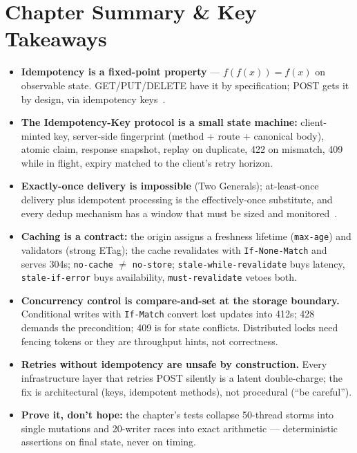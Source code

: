 \section{Chapter Summary \& Key Takeaways}
\label{sec:ch10-summary}

\begin{itemize}
  \item \textbf{Idempotency is a fixed-point property} ---
        $f(f(x)) = f(x)$ on observable state. GET/PUT/DELETE have it by
        specification; POST gets it by design, via idempotency
        keys~\cite{rfc9110}.
  \item \textbf{The Idempotency-Key protocol is a small state machine:}
        client-minted key, server-side fingerprint (method + route +
        canonical body), atomic claim, response snapshot, replay on
        duplicate, 422 on mismatch, 409 while in flight, expiry matched to
        the client's retry horizon.
  \item \textbf{Exactly-once delivery is impossible} (Two Generals);
        at-least-once delivery plus idempotent processing is the
        effectively-once substitute, and every dedup mechanism has a window
        that must be sized and monitored~\cite{kleppmann2017ddia}.
  \item \textbf{Caching is a contract:} the origin assigns a freshness
        lifetime (\texttt{max-age}) and validators (strong ETag); the cache
        revalidates with \texttt{If-None-Match} and serves 304s;
        \texttt{no-cache} $\neq$ \texttt{no-store};
        \texttt{stale-while-revalidate} buys latency,
        \texttt{stale-if-error} buys availability, \texttt{must-revalidate}
        vetoes both.
  \item \textbf{Concurrency control is compare-and-set at the storage
        boundary.} Conditional writes with \texttt{If-Match} convert lost
        updates into 412s; 428 demands the precondition; 409 is for state
        conflicts. Distributed locks need fencing tokens or they are
        throughput hints, not correctness.
  \item \textbf{Retries without idempotency are unsafe by construction.}
        Every infrastructure layer that retries POST silently is a latent
        double-charge; the fix is architectural (keys, idempotent methods),
        not procedural (``be careful'').
  \item \textbf{Prove it, don't hope:} the chapter's tests collapse
        50-thread storms into single mutations and 20-writer races into
        exact arithmetic --- deterministic assertions on final state, never
        on timing.
\end{itemize}

